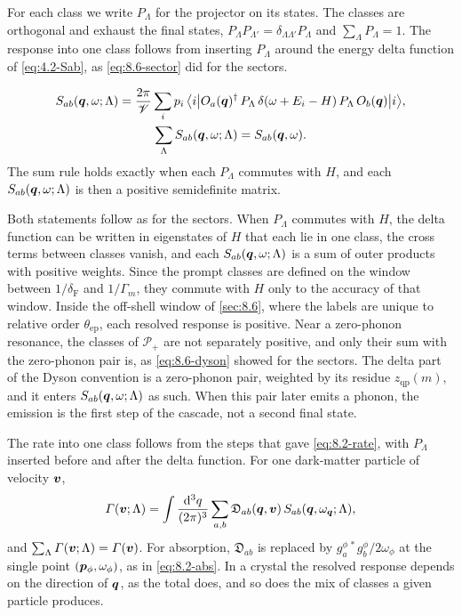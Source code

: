 For each class we write $P_\Lambda$ for the projector on its states. The classes are orthogonal and exhaust the final states, $P_\Lambda P_{\Lambda'} = \delta_{\Lambda\Lambda'}P_\Lambda$ and $\sum_\Lambda P_\Lambda = 1$. The response into one class follows from inserting $P_\Lambda$ around the energy delta function of \cref{eq:4.2-Sab}, as \cref{eq:8.6-sector} did for the sectors.
\begin{keyresult}
\begin{equation}
  \begin{gathered}
  S_{ab}(\bm{q},\omega;\Lambda) = \frac{2\pi}{\mathscr{V}}\sum_ip_i\,\bigl\langle i\big|O_a(\bm{q})^\dagger\,P_\Lambda\,\delta(\omega + E_i - H)\,P_\Lambda\,O_b(\bm{q})\big|i\bigr\rangle , \\
  \sum_\Lambda S_{ab}(\bm{q},\omega;\Lambda) = S_{ab}(\bm{q},\omega) .
  \end{gathered}
  \label{eq:8.7-resolved}
\end{equation}
The sum rule holds exactly when each $P_\Lambda$ commutes with $H$, and each $S_{ab}(\bm{q},\omega;\Lambda)$ is then a positive semidefinite matrix.
\end{keyresult}
\noindent Both statements follow as for the sectors. When $P_\Lambda$ commutes with $H$, the delta function can be written in eigenstates of $H$ that each lie in one class, the cross terms between classes vanish, and each $S_{ab}(\bm{q},\omega;\Lambda)$ is a sum of outer products with positive weights. Since the prompt classes are defined on the window between $1/\delta_{\mathrm{F}}$ and $1/\varGamma_m$, they commute with $H$ only to the accuracy of that window. Inside the off-shell window of \cref{sec:8.6}, where the labels are unique to relative order $\theta_{\mathrm{ep}}$, each resolved response is positive. Near a zero-phonon resonance, the classes of $\mathcal{P}_+$ are not separately positive, and only their sum with the zero-phonon pair is, as \cref{eq:8.6-dyson} showed for the sectors. The delta part of the Dyson convention is a zero-phonon pair, weighted by its residue $z_{\mathrm{qp}}(m)$, and it enters $S_{ab}(\bm{q},\omega;\Lambda)$ as such. When this pair later emits a phonon, the emission is the first step of the cascade, not a second final state.

The rate into one class follows from the steps that gave \cref{eq:8.2-rate}, with $P_\Lambda$ inserted before and after the delta function. For one dark-matter particle of velocity $\bm{v}$,
\begin{equation}
  \varGamma(\bm{v};\Lambda) = \int\frac{\mathrm{d}^3q}{(2\pi)^3}\sum_{a,b}\mathfrak{D}_{ab}(\bm{q},\bm{v})\,S_{ab}(\bm{q},\omega_{\bm{q}};\Lambda) ,
  \label{eq:8.7-classrate}
\end{equation}
and $\sum_\Lambda\varGamma(\bm{v};\Lambda) = \varGamma(\bm{v})$. For absorption, $\mathfrak{D}_{ab}$ is replaced by $g^{\phi\,*}_ag^\phi_b/2\omega_\phi$ at the single point $(\bm{p}_\phi,\omega_\phi)$, as in \cref{eq:8.2-abs}. In a crystal the resolved response depends on the direction of $\bm{q}$, as the total does, and so does the mix of classes a given particle produces.

